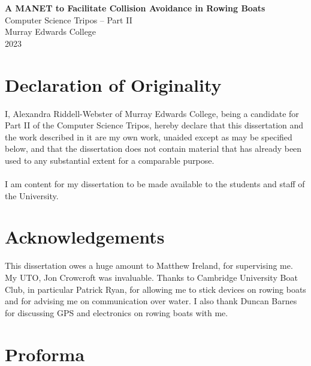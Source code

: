 \documentclass[12pt,a4paper]{report}
\begin{document}


\thispagestyle{empty}


\vspace*{60mm}
\begin{center}
\Huge
\textbf{A MANET to Facilitate Collision Avoidance in Rowing Boats} \\[5mm]
Computer Science Tripos -- Part II \\[5mm]
Murray Edwards College \\[5mm]
2023
\end{center}

\pagestyle{plain}
\chapter*{Declaration of Originality}

I, Alexandra Riddell-Webster of Murray Edwards College, being a candidate for Part II of the Computer Science Tripos, hereby declare that this dissertation and the work described in it are my own work, unaided except as may be specified below, and that the dissertation does not contain material that has already been used to any substantial extent for a comparable purpose. \\ \\
I am content for my dissertation to be made available to the students and staff of the
University. \\

\bigskip
{}

\chapter*{Acknowledgements}
This dissertation owes a huge amount to Matthew Ireland, for supervising me. My UTO, Jon Crowcroft was invaluable. Thanks to Cambridge University Boat Club, in particular Patrick Ryan, for allowing me to stick devices on rowing boats and for advising me on communication over water. I also thank Duncan Barnes for discussing GPS and electronics on rowing boats with me.



\chapter*{Proforma}
\end{document}
